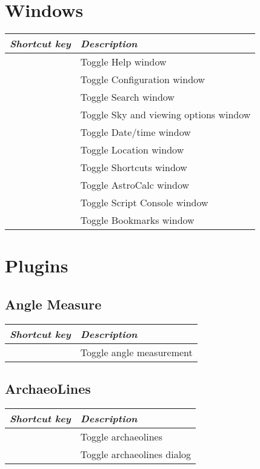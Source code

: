\section{Windows}
\label{ch:Hotkeys:Windows}
\begin{longtabu}to \textwidth {rl} 
\toprule
\emph{Shortcut key}	& \emph{Description}\\\midrule
{}			& Toggle Help window \\
			& Toggle Configuration window \\
			& Toggle Search window \\
			& Toggle Sky and viewing options window \\
			& Toggle Date/time window \\
			& Toggle Location window \\
			& Toggle Shortcuts window \\
			& Toggle AstroCalc window\\
			& Toggle Script Console window \\
			& Toggle Bookmarks window \\
\bottomrule
\end{longtabu}

\section{Plugins}
\label{ch:Hotkeys:Plugins}

\subsection{Angle Measure}
\label{ch:Hotkeys:Plugins:AngleMeasure}
\begin{longtabu}to \textwidth {rl} 
\toprule
\emph{Shortcut key}	& \emph{Description}\\\midrule
{}		& Toggle angle measurement \\
\bottomrule
\end{longtabu}

\subsection{ArchaeoLines}
\label{ch:Hotkeys:Plugins:ArchaeoLines}
\begin{longtabu}to \textwidth {rl} 
\toprule
\emph{Shortcut key}	& \emph{Description}\\\midrule
{}		& Toggle archaeolines \\
	& Toggle archaeolines dialog\\
\bottomrule
\end{longtabu}

